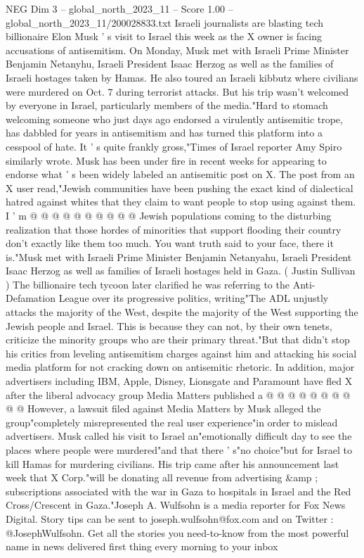 \begin{textsample}{NEG Dim 3 – global\_north\_2023\_11 – Score 1.00 – global\_north\_2023\_11/200028833.txt}  \label{ex:f3_neg_279}
Israeli journalists are blasting tech billionaire Elon Musk ' s visit to Israel this week as the X owner is facing accusations of antisemitism.
On Monday, Musk met with Israeli Prime Minister Benjamin Netanyhu, Israeli President Isaac Herzog as well as the families of Israeli hostages taken by Hamas.
He also toured an Israeli kibbutz where civilians were murdered on Oct. 7 during terrorist attacks.
But his trip wasn't welcomed by everyone in Israel, particularly members of the media."Hard to stomach welcoming someone who just days ago endorsed a virulently antisemitic trope, has dabbled for years in antisemitism and has turned this platform into a cesspool of hate.
It ' s quite frankly gross,"Times of Israel reporter Amy Spiro similarly wrote.
Musk has been under fire in recent weeks for appearing to endorse what ' s been widely labeled an antisemitic post on X.
The post from an X user read,"Jewish communities have been pushing the exact kind of dialectical hatred against whites that they claim to want people to stop using against them.
I ' m @ @ @ @ @ @ @ @ @ @ Jewish populations coming to the disturbing realization that those hordes of minorities that support flooding their country don't exactly like them too much.
You want truth said to your face, there it is."Musk met with Israeli Prime Minister Benjamin Netanyahu, Israeli President Isaac Herzog as well as families of Israeli hostages held in Gaza. ( Justin Sullivan ) The billionaire tech tycoon later clarified he was referring to the Anti-Defamation League over its progressive politics, writing"The ADL unjustly attacks the majority of the West, despite the majority of the West supporting the Jewish people and Israel.
This is because they can not, by their own tenets, criticize the minority groups who are their primary threat."But that didn't stop his critics from leveling antisemitism charges against him and attacking his social media platform for not cracking down on antisemitic rhetoric.
In addition, major advertisers including IBM, Apple, Disney, Lionsgate and Paramount have fled X after the liberal advocacy group Media Matters published a @ @ @ @ @ @ @ @ @ @ However, a lawsuit filed against Media Matters by Musk alleged the group"completely misrepresented the real user experience"in order to mislead advertisers.
Musk called his visit to Israel an"emotionally difficult day to see the places where people were murdered"and that there ' s"no choice"but for Israel to kill Hamas for murdering civilians.
His trip came after his announcement last week that X Corp."will be donating all revenue from advertising \&amp ; subscriptions associated with the war in Gaza to hospitals in Israel and the Red Cross/Crescent in Gaza."Joseph A.
Wulfsohn is a media reporter for Fox News Digital.
Story tips can be sent to joseph.wulfsohn@fox.com and on Twitter : @JosephWulfsohn.
Get all the stories you need-to-know from the most powerful name in news delivered first thing every morning to your inbox

\end{textsample}
